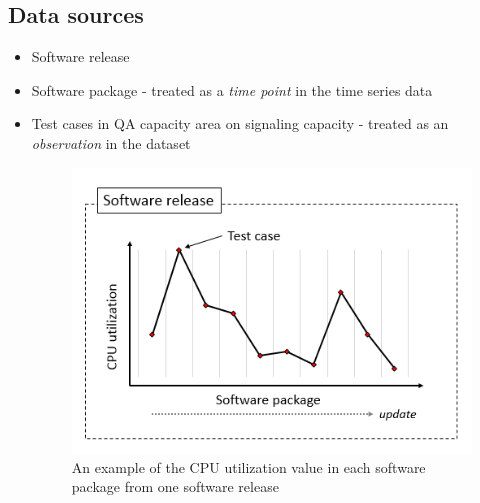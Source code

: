 \documentclass{beamer}
\begin{document}
\subsection{Data sources}
\begin{frame}[fragile]

\begin{itemize}
	\item Software release
	\item Software package - treated as a \textit{time point} in the time series data
	\item Test cases \footnotesize{in QA capacity area on signaling capacity} \normalsize{- treated as an \textit{observation} in the dataset}
	
	\begin{figure}
		\includegraphics[width=0.6\linewidth]{data-structure}
		\caption{An example of the CPU utilization value in each software package from one software release}
	\end{figure}
	
\end{itemize}

\end{frame}
\end{document}
